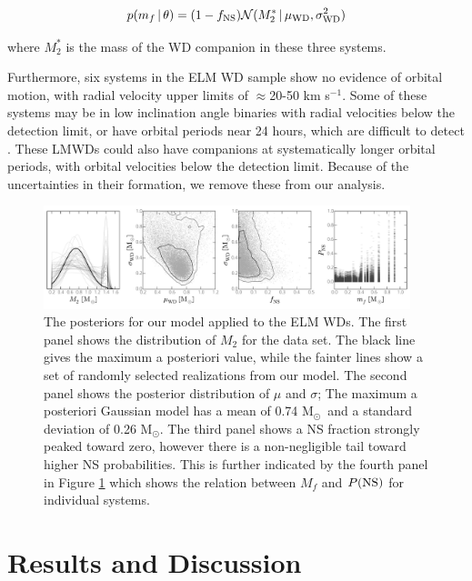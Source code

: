 \documentclass[letterpaper,12pt,preprint]{aastex}
\newcommand{\given}{\,|\,}
\newcommand{\Msun}{\ifmmode {{\rm M}_{\odot}}\else M$_{\odot}$\fi}
\begin{document}
\begin{equation}
p(m_f \given \theta) = (1-f_{\rm NS}) \mathcal{N}(M_2^* \given \mu_{\rm WD}, \sigma^2_{\rm WD})
\end{equation}

where $M_2^*$ is the mass of the WD companion in these three systems. 

Furthermore, six systems in the ELM WD sample show no evidence of orbital motion, with radial velocity upper limits of $\approx$20-50 km s$^{-1}$. Some of these systems may be in low inclination angle binaries with radial velocities below the detection limit, or have orbital periods near 24 hours, which are difficult to detect \citep{ELMV}. These LMWDs could also have companions at systematically longer orbital periods, with orbital velocities below the detection limit. Because of the uncertainties in their formation, we remove these from our analysis.




\begin{figure}[h!]
\begin{center}
\includegraphics[width=0.95\textwidth]{real-data.pdf}
\caption{The posteriors for our model applied to the ELM WDs. The first panel shows the distribution of $M_2$ for the data set. The black line gives the maximum a posteriori value, while the fainter lines show a set of randomly selected realizations from our model. The second panel shows the posterior distribution of $\mu$ and $\sigma$; The maximum a posteriori Gaussian model has a mean of 0.74 \Msun\ and a standard deviation of 0.26 \Msun. The third panel shows a NS fraction strongly peaked toward zero, however there is a non-negligible tail toward higher NS probabilities. This is further indicated by the fourth panel in Figure \ref{fig:ELM_post} which shows the relation between $M_f$ and $P({\rm NS})$ for individual systems. }
\label{fig:ELM_post}
\end{center}
\end{figure}



\section{Results and Discussion}
\end{document}
